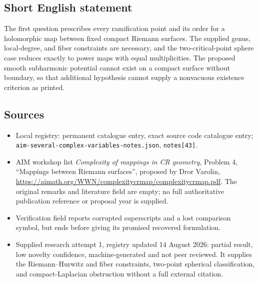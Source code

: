 \documentclass[11pt]{article}
\begin{document}
\subsection{Short English statement}
The first question prescribes every ramification point and its order for a holomorphic map between fixed compact Riemann surfaces. The supplied genus, local-degree, and fiber constraints are necessary, and the two-critical-point sphere case reduces exactly to power maps with equal multiplicities. The proposed smooth subharmonic potential cannot exist on a compact surface without boundary, so that additional hypothesis cannot supply a nonvacuous existence criterion as printed.
\subsection{Sources}
\begin{itemize}
\item Local registry: permanent catalogue entry, exact source code catalogue entry; \texttt{aim-several-complex-variables-notes.json}, \texttt{notes[43]}.
\item AIM workshop list \emph{Complexity of mappings in CR geometry}, Problem 4, ``Mappings between Riemann surfaces'', proposed by Dror Varolin, \url{https://aimath.org/WWN/complexitycrmap/complexitycrmap.pdf}. The original remarks and literature field are empty; no full authoritative publication reference or proposal year is supplied.
\item Verification field reports corrupted superscripts and a lost comparison symbol, but ends before giving its promised recovered formulation.
\item Supplied research attempt 1, registry updated 14 August 2026: partial result, low novelty confidence, machine-generated and not peer reviewed. It supplies the Riemann--Hurwitz and fiber constraints, two-point spherical classification, and compact-Laplacian obstruction without a full external citation.
\end{itemize}
\end{document}
